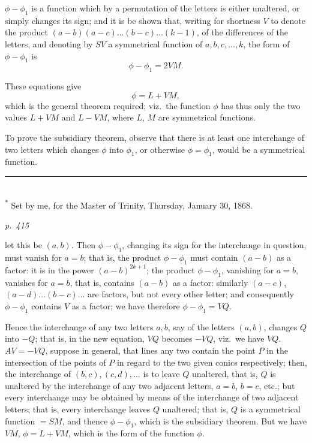 \documentclass[11pt,a4paper]{book}
\begin{document}
$\phi - \phi_1$ is a function which by a permutation of the letters is either unaltered, or
simply changes its sign; and it is be shown that, writing for shortness $V$ to denote
the product $(a - b)(a - c) \ldots (b - c) \ldots (k - 1)$, of the differences of the letters, and denoting
by $S V$ a symmetrical function of $a, b, c, \ldots, k$, the form of $\phi - \phi_1$ is
\[
\phi - \phi_1 = 2 V M.
\]

These equations give
\[
\phi = L + V M,
\]
which is the general theorem required; viz.\ the function $\phi$ has thus only the two
values $L + V M$ and $L - V M$, where $L$, $M$ are symmetrical functions.

To prove the subsidiary theorem, observe that there is at least one interchange of
two letters which changes $\phi$ into $\phi_1$, or otherwise $\phi = \phi_1$, would be a symmetrical function.

\noindent\rule{0.45\textwidth}{0.4pt}\\
\footnotesize\textsuperscript{*} Set by me, for the Master of Trinity, Thursday, January 30, 1868.\normalsize

\clearpage

\bigskip
\textit{p.~415}
\smallskip

\noindent
let this be $(a, b)$. Then $\phi - \phi_1$, changing its sign for the interchange in question, must
vanish for $a = b$; that is, the product $\phi - \phi_1$ must contain $(a - b)$ as a factor: it is
in the power $(a - b)^{2k+1}$; the product $\phi - \phi_1$, vanishing for $a = b$, vanishes for $a = b$,
that is, contains $(a - b)$ as a factor: similarly $(a - c)$, $(a - d) \ldots (b - c) \ldots$ are factors, but
not every other letter; and consequently $\phi - \phi_1$ contains $V$ as a factor; we have therefore
$\phi - \phi_1 = V Q$.

Hence the interchange of any two letters $a, b$, say of the letters $(a, b)$, changes
$Q$ into $- Q$; that is, in the new equation, $V Q$ becomes $- V Q$, viz.\ we have $V Q$.
$A V = - V Q$, suppose in general, that lines any two contain the point $P$ in the
intersection of the points of $P$ in regard to the two given conics respectively; then,
the interchange of $(b, c), (c, d), \ldots$ is to leave $Q$ unaltered, that is, $Q$ is unaltered by
the interchange of any two adjacent letters, $a = b$, $b = c$, etc.; but every interchange may be
obtained by means of the interchange of two adjacent letters; that is, every interchange
leaves $Q$ unaltered; that is, $Q$ is a symmetrical function $= S M$, and thence $\phi - \phi_1$,
which is the subsidiary theorem.  But we have $V M$, $\phi = L + V M$, which is the
form of the function $\phi$.
\end{document}
